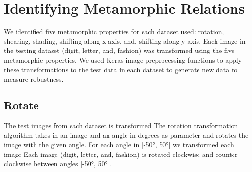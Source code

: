 \section{Identifying Metamorphic Relations} 
We identified five metamorphic properties for each dataset used: rotation, shearing, shading, shifting along x-axis, and, shifting along y-axis. Each image in the testing dataset (digit, letter, and, fashion) was transformed using the five metamorphic properties. We used Keras image preprocessing functions to apply these transformations to the test data in each dataset to generate new data to measure robustness.
\subsection{Rotate}
The test images from each dataset is transformed The rotation transformation algorithm takes in an image and an angle in degrees as parameter and rotates the image with the given angle. For each angle in [\ang{-50}, \ang{50}] we transformed each image Each image (digit, letter, and, fashion) is rotated clockwise and counter clockwise between angles [\ang{-50}, \ang{50}]. 
